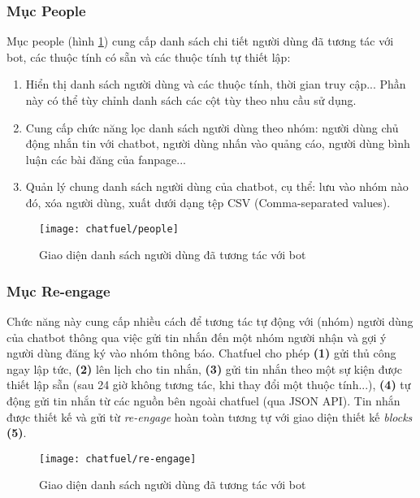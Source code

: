 \subsubsection{Mục People}
Mục people (hình \ref{fig:fig-c3-people}) cung cấp danh sách chi tiết người dùng đã tương tác với bot, các thuộc tính có sẵn và các thuộc tính tự thiết lập:
\begin{enumerate}[label=\textbf{(\arabic*)},align=left,left=0cm..0cm,itemindent=*]
	\item Hiển thị danh sách người dùng và các thuộc tính, thời gian truy cập... Phần này có thể tùy chỉnh danh sách các cột tùy theo nhu cầu sử dụng.
	\item Cung cấp chức năng lọc danh sách người dùng theo nhóm: người dùng chủ động nhắn tin với chatbot, người dùng nhấn vào quảng cáo, người dùng bình luận các bài đăng của fanpage...
	\item Quản lý chung danh sách người dùng của chatbot, cụ thể: lưu vào nhóm nào đó, xóa người dùng, xuất dưới dạng tệp CSV (Comma-separated values).
\end{enumerate}\par

\begin{figure}[htb!]\centering
	\texttt{[image: chatfuel/people]}
	\caption{Giao diện danh sách người dùng đã tương tác với bot}
	\label{fig:fig-c3-people}
\end{figure}\par

\subsubsection{Mục Re-engage}
Chức năng này cung cấp nhiều cách để tương tác tự động với (nhóm) người dùng của chatbot thông qua việc gửi tin nhắn đến một nhóm người nhận và gợi ý người dùng đăng ký vào nhóm thông báo. Chatfuel cho phép \textbf{(1)} gửi thủ công ngay lập tức, \textbf{(2)} lên lịch cho tin nhắn, \textbf{(3)} gửi tin nhắn theo một sự kiện được thiết lập sẵn (sau 24 giờ không tương tác, khi thay đổi một thuộc tính...), \textbf{(4)} tự động gửi tin nhắn từ các nguồn bên ngoài chatfuel (qua JSON API). Tin nhắn được thiết kế và gửi từ \textit{re-engage} hoàn toàn tương tự với giao diện thiết kế \textit{blocks} \textbf{(5)}.\par

\begin{figure}[htb!]\centering
	\texttt{[image: chatfuel/re-engage]}
	\caption{Giao diện danh sách người dùng đã tương tác với bot}
	\label{fig:fig-c3-re-engage}
\end{figure}\par

